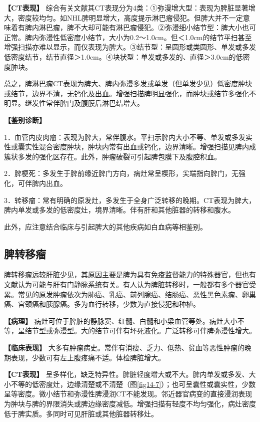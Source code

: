 \textbf{【CT表现】}
综合有关文献其CT表现分为4类：①弥漫增大型：表现为脾脏显著增大，密度较均匀。如NHL脾明显增大，高度提示淋巴瘤侵犯。但脾大并不一定意味着有脾内淋巴瘤，脾不大却可能有淋巴瘤侵犯。②弥漫细小结节型：脾大小也可正常。脾内弥漫性低密度小结节，大小为0.2～1.0cm。但＜1.0cm的结节平扫甚至增强扫描亦难以显示，而仅表现为脾大。③结节型：呈圆形或类圆形、单发或多发低密度结节，结节直径＞1.0cm。④块状型：单发或多发的、直径＞3.0cm的低密度肿块。

总之，脾淋巴瘤CT表现为脾大、脾内弥漫多发或单发（但单发少见）低密度肿块或结节，边界不清，无钙化及出血。增强扫描脾明显强化，而肿块或结节多强化不明显。继发性常伴脾门及腹膜后淋巴结增大。

\textbf{【鉴别诊断】}

1．血管内皮肉瘤：表现为脾大，常伴腹水。平扫示脾内大小不等、单发或多发实性或囊实性混合密度肿块，肿块内常有出血或钙化，边界清晰。增强扫描见脾内成簇状多发的强化区存在。此外，肿瘤破裂可引起脾包膜下及腹腔积血。

2．脾梗死：多发生于脾前缘近脾门方向，病灶常呈楔形，尖端指向脾门，无强化，可伴脾内出血。

3．转移瘤：常有明确的原发灶，多发生于全身广泛转移的晚期。CT表现为脾大，脾内单发或多发的低密度灶，境界清晰。伴有肝和其他脏器的转移和腹水。

此外，应注意结合临床与引起脾大的其他疾病如白血病等相鉴别。

\subsection{脾转移瘤}

脾转移瘤远较肝脏少见，其原因主要是脾为具有免疫监督能力的特殊器官，但也有文献认为可能与肝有门静脉系统有关。有人认为脾脏转移时，一般都有多个器官受累。常见的原发肿瘤依次为肺癌、乳癌、前列腺癌、结肠癌、恶性黑色素瘤、卵巢癌、宫颈癌和胰腺癌。多为血行转移，少数为直接侵犯和种植。

\textbf{【病理】}
病灶可位于脾脏的静脉窦、红髓、白髓和小梁血管等处。病灶大小不等，呈结节型或弥漫型。大的结节可伴有坏死液化。广泛转移可伴脾弥漫性增大。

\textbf{【临床表现】}
大多有肿瘤病史。常伴有消瘦、乏力、低热、贫血等恶性肿瘤的晚期表现，少数可有左上腹疼痛不适。体检脾脏增大。

\textbf{【CT表现】}
呈多样化，缺乏特异性。脾脏轻度增大或不大。脾内单发或多发、大小不等的低密度灶，边缘清楚或不清楚（图\ref{fig14-7}）；也可呈囊性或囊实性，少数呈等密度。微小结节和弥漫性脾浸润CT不能发现。邻近器官病变的直接浸润表现为肿块与脾的界限消失或脾边缘密度减低。增强扫描有轻度不均匀强化，病灶密度低于脾实质。多同时可见肝脏或其他脏器转移灶。

